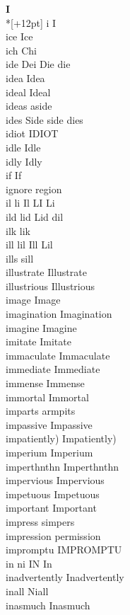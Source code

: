 \vspace{14pt}
\noindent\textbf{\Large I}\\*[+12pt]
i I\\
ice Ice\\
ich Chi\\
ide Dei Die die\\
idea Idea\\
ideal Ideal\\
ideas aside\\
ides Side side dies\\
idiot IDIOT\\
idle Idle\\
idly Idly\\
if If\\
ignore region\\
il li Il LI Li\\
ild lid Lid dil\\
ilk lik\\
ill lil Ill Lil\\
ills sill\\
illustrate Illustrate\\
illustrious Illustrious\\
image Image\\
imagination Imagination\\
imagine Imagine\\
imitate Imitate\\
immaculate Immaculate\\
immediate Immediate\\
immense Immense\\
immortal Immortal\\
imparts armpits\\
impassive Impassive\\
impatiently) Impatiently)\\
imperium Imperium\\
imperthnthn Imperthnthn\\
impervious Impervious\\
impetuous Impetuous\\
important Important\\
impress simpers\\
impression permission\\
impromptu IMPROMPTU\\
in ni IN In\\
inadvertently Inadvertently\\
inall Niall\\
inasmuch Inasmuch\\
